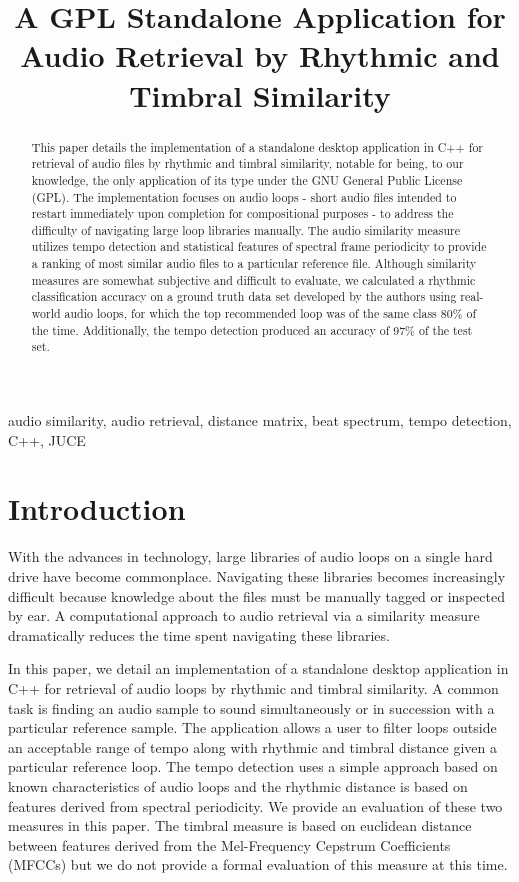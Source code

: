 \documentclass{article}
\title{A GPL Standalone Application for Audio Retrieval by Rhythmic and Timbral Similarity}
\begin{document}
%
\maketitle
%
\begin{abstract}
This paper details the implementation of a standalone desktop application in C++ for retrieval of audio files by rhythmic and timbral similarity, notable for being, to our knowledge, the only application of its type under the GNU General Public License (GPL). The implementation focuses on audio loops - short audio files intended to restart immediately upon completion for compositional purposes - to address the difficulty of navigating large loop libraries manually. The audio similarity measure utilizes tempo detection and statistical features of spectral frame periodicity to provide a ranking of most similar audio files to a particular reference file. Although similarity measures are somewhat subjective and difficult to evaluate, we calculated a rhythmic classification accuracy on a ground truth data set developed by the authors using real-world audio loops, for which the top recommended loop was of the same class 80\% of the time. Additionally, the tempo detection produced an accuracy of 97\% of the test set.

\end{abstract}
%
\begin{keywords}
audio similarity, audio retrieval, distance matrix, beat spectrum, tempo detection, C++, JUCE
\end{keywords}
%
\section{Introduction}

With the advances in technology, large libraries of audio loops on a single hard drive have become commonplace. Navigating these libraries becomes increasingly difficult because knowledge about the files must be manually tagged or inspected by ear. A computational approach to audio retrieval via a similarity measure dramatically reduces the time spent navigating these libraries.

In this paper, we detail an implementation of a standalone desktop application in C++ for retrieval of audio loops by rhythmic and timbral similarity. A common task is finding an audio sample to sound simultaneously or in succession with a particular reference sample. The application allows a user to filter loops outside an acceptable range of tempo along with rhythmic and timbral distance given a particular reference loop. The tempo detection uses a simple approach based on known characteristics of audio loops and the rhythmic distance is based on features derived from spectral periodicity. We provide an evaluation of these two measures in this paper. The timbral measure is based on euclidean distance between features derived from the Mel-Frequency Cepstrum Coefficients (MFCCs) but we do not provide a formal evaluation of this measure at this time.
\end{document}
